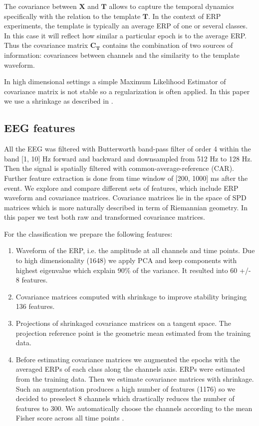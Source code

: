 \documentclass[12pt]{iopart}
\begin{document}
The covariance between $\mathbf{X}$ and $\mathbf{T}$ allows to capture the temporal dynamics
specifically with the relation to the template $\mathbf{T}$. In the context of ERP
experiments, the template is typically an average ERP of one or several classes.
In this case it will reflect how similar a particular epoch is to the average ERP.
Thus the covariance matrix $\mathbf{C}_\mathbf{T}$ contains the combination
of two sources of information: covariances between channels and the similarity to the template waveform.

In high dimensional settings a simple Maximum Likelihood Estimator of covariance matrix is not
stable so a regularization is often applied. In this paper we use
a shrinkage as described in \cite{chen_shrinkage_2010}.

\subsection{EEG features}
All the EEG was filtered with Butterworth band-pass filter of order 4 within the band [1, 10] Hz
forward and backward and downsampled from 512 Hz to 128 Hz. Then the signal is spatially
filtered with common-average-reference (CAR). Further feature extraction is done
from time window of [200, 1000] ms after the event. We explore and compare different sets
of features, which include ERP waveform and covariance matrices.
Covariance matrices lie in the space of SPD matrices which is more naturally 
described in term of Riemannian geometry. In this paper we test both raw
and transformed covariance matrices.

For the classification we prepare the following features:
\begin{enumerate}
    \item Waveform of the ERP, i.e. the amplitude at all channels and time points. Due to high
        dimensionality (1648) we apply PCA and keep components with highest eigenvalue
        which explain 90\% of the variance. It resulted into 60 +/- 8 features.
    \item Covariance matrices computed with shrinkage to improve stability bringing 136 features.
    \item Projections of shrinkaged covariance matrices on a tangent space. The projection reference
        point is the geometric mean estimated from the training data.
    \item Before estimating covariance matrices we augmented the epochs with the averaged ERPs
        of each class along the channels axis. ERPs were estimated from the training data. 
        Then we estimate covariance matrices with shrinkage. Such an augmentation produces
        a high number of features (1176) so we decided to preselect 8 channels which
        drastically reduces the number of features to 300. We automatically choose
        the channels according to the mean Fisher score across all time points \cite{duda_pattern_2001}.
\end{enumerate}
\end{document}
